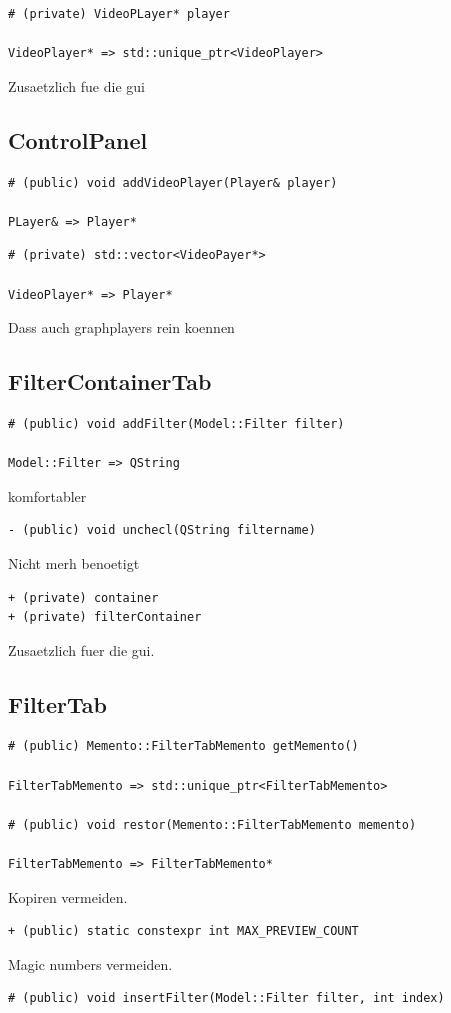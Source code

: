 \documentclass{scrartcl}
\begin{document}
{\begin{verbatim}
# (private) VideoPLayer* player

VideoPlayer* => std::unique_ptr<VideoPlayer>
\end{verbatim}
Zusaetzlich fue die gui
\subsection{ControlPanel}
\begin{verbatim}
# (public) void addVideoPlayer(Player& player)

PLayer& => Player*
\end{verbatim}
\begin{verbatim}
# (private) std::vector<VideoPayer*>

VideoPlayer* => Player*
\end{verbatim}
Dass auch graphplayers rein koennen
\subsection{FilterContainerTab}
\begin{verbatim}
# (public) void addFilter(Model::Filter filter)

Model::Filter => QString
\end{verbatim}
komfortabler
\begin{verbatim}
- (public) void unchecl(QString filtername)
\end{verbatim}
Nicht merh benoetigt
\begin{verbatim}
+ (private) container
+ (private) filterContainer
\end{verbatim}
Zusaetzlich fuer die gui.
\subsection{FilterTab}
\begin{verbatim}
# (public) Memento::FilterTabMemento getMemento()

FilterTabMemento => std::unique_ptr<FilterTabMemento>

# (public) void restor(Memento::FilterTabMemento memento)

FilterTabMemento => FilterTabMemento*
\end{verbatim}
Kopiren vermeiden.
\begin{verbatim}
+ (public) static constexpr int MAX_PREVIEW_COUNT
\end{verbatim}
Magic numbers vermeiden.

\begin{verbatim}
# (public) void insertFilter(Model::Filter filter, int index)


\end{verbatim}}
\end{document}
